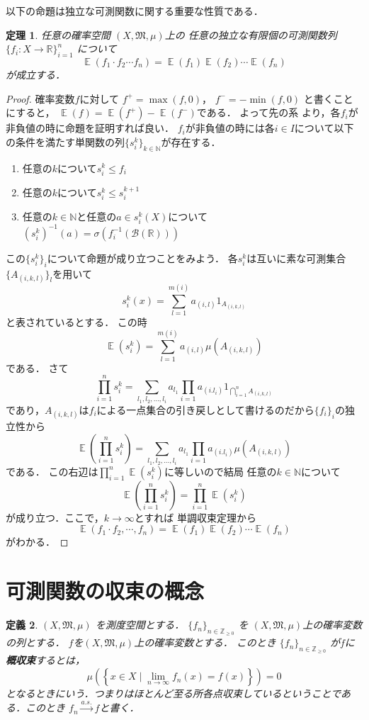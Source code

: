 \documentclass[leqno, a4paper, 12pt]{jsarticle}
\newtheorem{thm}{定理}
\newtheorem{df}[thm]{定義}
\newcommand{\nn}{\mathbb{N}}
\newcommand{\zz}{\mathbb{Z}}
\newcommand{\rr}{\mathbb{R}}
\DeclareMathOperator{\mean}{\mathbb{E}}
\begin{document}
以下の命題は独立な可測関数に関する重要な性質である．
\begin{thm}\label{thm:ind}
任意の確率空間
$(X, \mathfrak{M}, \mu)$上の
任意の独立な有限個の可測関数列
$\{f_i:X\to \rr\}_{i=1}^n$
について
\[
\mean(f_1\cdot f_2  \cdots f_n)=\mean(f_1)\mean(f_2) \cdots \mean(f_n)
\]
が成立する．
\end{thm}
\begin{proof}
確率変数$f$に対して
$f^+=\max(f, 0)$，
$f^-=-\min(f, 0)$
と書くことにすると，
$\mean(f)=\mean(f^+)-\mean(f^-)$である．
よって先の系
より，各$f_i$が非負値の時に命題を証明すれば良い．
$f_i$が非負値の時には各$i\in I$について以下の条件を満たす単関数の列$\{s_i^k\}_{k\in \nn}$が存在する．
\begin{enumerate}
\item 任意の$k$について$s_i^k\le f_i$
\item 任意の$k$について$s_i^k\le s_i^{k+1}$
\item 任意の$k\in \nn$と任意の$a\in s_i^k(X)$について
$(s_i^k)^{-1}(a)=\sigma(f_i^{-1}(\mathcal{B}(\rr)))$
\end{enumerate}
この$\{s_i^k\}_{i}$について命題が成り立つことをみよう．
各$s_i^k$は互いに素な可測集合$\{A_{(i, k,l)}\}_l$を用いて
\[
s_i^k(x)=\sum_{l=1}^{m(i)}a_{(i,l)}1_{A_{(i,k,l)}}
\]
と表されているとする．
この時
\[
\mean(s_i^k)=\sum_{l=1}^{m(i)}a_{(i, l)}\mu(A_{(i, k, l)})
\]
である．
さて
\[
\prod_{i=1}^ns_i^k=\sum_{l_1, l_2, \dots, l_i}a_{l_1}\prod_{i=1}a_{(i. l_i)}1_{\bigcap_{i=1}^nA_{(i, k, l)}}
\]
であり，$A_{(i, k, l)}$は$f_i$による一点集合の引き戻しとして書けるのだから$\{f_i\}_i$の独立性から
\[
\mean\left(\prod_{i=1}^ns_i^k\right)=\sum_{l_1, l_2, \dots, l_i}a_{l_1}\prod_{i=1}a_{(i. l_i)}\mu(A_{(i, k, l)})
\]
である．
この右辺は$\prod_{i=1}^n\mean(s_i^k)$に等しいので結局
任意の$k\in \nn$について
\[
\mean\left(\prod_{i=1}^ns_i^k\right)=\prod_{i=1}^n\mean(s_i^k)
\]
が成り立つ．ここで，$k\to \infty$とすれば
単調収束定理から
\[
\mean(f_1\cdot f_2, \cdots, f_n)=
\mean(f_1)\mean(f_2) \cdots \mean(f_n)
\]
がわかる．
\end{proof}

\section{可測関数の収束の概念}

\begin{df}
$(X, \mathfrak{M}, \mu)$
を測度空間とする．
$\{f_{n}\}_{n\in \zz_{\ge 0}}$
を
$(X, \mathfrak{M}, \mu)$上の確率変数の列とする．
$f$を$(X, \mathfrak{M}, \mu)$上の確率変数とする．
このとき
$\{f_{n}\}_{n\in \zz_{\ge 0}}$
が$f$に\textbf{概収束}するとは，
\[
\mu\left(\left\{x\in X\mid 
\lim_{n\to \infty}f_{n}(x)=f(x)\right\}\right)=0
\]
となるときにいう．つまりはほとんど至る所各点収束しているということである．このとき
$f_{n}\xrightarrow{a. s.}f$と書く．
\end{df}
\end{document}
